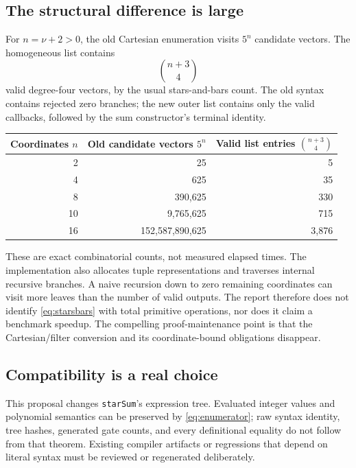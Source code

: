 \documentclass[11pt,letterpaper]{article}
\newcommand{\code}[1]{{\small\nolinkurl{#1}}}
\begin{document}
\subsection{The structural difference is large}

For $n=\nu+2>0$, the old Cartesian enumeration visits $5^n$ candidate vectors. The homogeneous list contains
\begin{equation}
 \binom{n+3}{4}
 \label{eq:starsbars}
\end{equation}
valid degree-four vectors, by the usual stars-and-bars count. The old syntax contains rejected zero branches; the new outer list contains only the valid callbacks, followed by the sum constructor's terminal identity.

\begin{center}
\begin{tabular}{@{}rrr@{}}
\toprule
Coordinates $n$ & Old candidate vectors $5^n$ & Valid list entries $\binom{n+3}{4}$ \\
\midrule
2 & 25 & 5 \\
4 & 625 & 35 \\
8 & 390,625 & 330 \\
10 & 9,765,625 & 715 \\
16 & 152,587,890,625 & 3,876 \\
\bottomrule
\end{tabular}
\end{center}

These are exact combinatorial counts, not measured elapsed times. The implementation also allocates tuple representations and traverses internal recursive branches. A naive recursion down to zero remaining coordinates can visit more leaves than the number of valid outputs. The report therefore does not identify \eqref{eq:starsbars} with total primitive operations, nor does it claim a benchmark speedup. The compelling proof-maintenance point is that the Cartesian/filter conversion and its coordinate-bound obligations disappear.

\subsection{Compatibility is a real choice}

This proposal changes \code{starSum}'s expression tree. Evaluated integer values and polynomial semantics can be preserved by \eqref{eq:enumerator}; raw syntax identity, tree hashes, generated gate counts, and every definitional equality do not follow from that theorem. Existing compiler artifacts or regressions that depend on literal syntax must be reviewed or regenerated deliberately.
\end{document}
